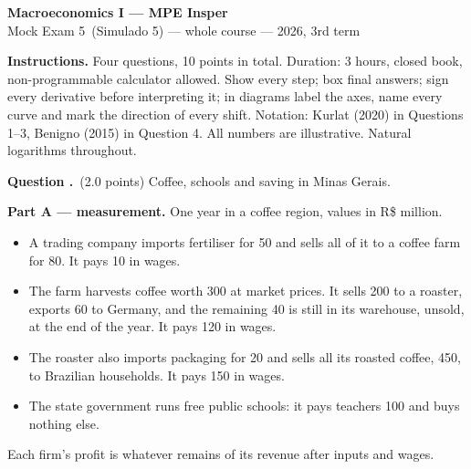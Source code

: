 \documentclass[11pt,a4paper]{article}
\newif\ifsolucoes
\newcommand{\disciplina}{Macroeconomics I --- MPE Insper}
\newcommand{\listatema}{Mock Exam 5}
\newcounter{questao}
\newcommand{\questao}[1]{\Needspace{12\baselineskip}\refstepcounter{questao}\bigskip\noindent
  {\large\bfseries\color{blue!55!black}Question \thequestao.}~#1\par\smallskip}
\begin{document}
\begin{center}
  {\Large\bfseries \disciplina}\\[2pt]
  {\large \listatema\ (Simulado 5) --- whole course --- 2026, 3rd term}\ifsolucoes\\[2pt]\textit{Solutions and Grading Rubric}\fi
\end{center}
\vspace{2pt}

{\footnotesize\noindent\textbf{Instructions.} Four questions, 10 points in total. Duration: 3 hours, closed
book, non-programmable calculator allowed. Show every step; box final answers; sign every derivative before
interpreting it; in diagrams label the axes, name every curve and mark the direction of every shift.
Notation: Kurlat (2020) in Questions 1--3, Benigno (2015) in Question 4. All numbers are illustrative.
Natural logarithms throughout.\par}

\ifsolucoes
\medskip
{\footnotesize\noindent\textbf{How the rubric works.} Conceptual caps (``max.\ $x$'') bound an item whatever
else is right. Light penalties ($-0.1$) apply to arithmetic slips with a correct method. Caps and penalties
are \emph{not cumulative}: when a cap applies, the penalties inside it are ignored. Each question ends with the
weak spot it retests (``Gap targeted''). Every number and closed form below is recomputed by
\texttt{simulado\_codigo/check\_simulado\_05.py}.\par}
\fi

\questao{(2.0 points) Coffee, schools and saving in Minas Gerais.}

\noindent\textbf{Part A --- measurement.} One year in a coffee region, values in R\$ million.
\begin{itemize}[leftmargin=1.4em]
\item A trading company imports fertiliser for 50 and sells all of it to a coffee farm for 80. It pays 10 in wages.
\item The farm harvests coffee worth 300 at market prices. It sells 200 to a roaster, exports 60 to Germany, and
the remaining 40 is still in its warehouse, unsold, at the end of the year. It pays 120 in wages.
\item The roaster also imports packaging for 20 and sells all its roasted coffee, 450, to Brazilian households.
It pays 150 in wages.
\item The state government runs free public schools: it pays teachers 100 and buys nothing else.
\end{itemize}
Each firm's profit is whatever remains of its revenue after inputs and wages.
\end{document}
